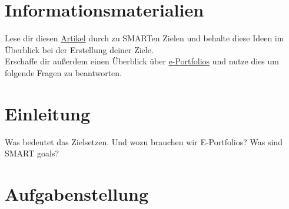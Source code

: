 \documentclass[a4paper,oneside]{scrarticle}
\begin{document}
	\pagebreak 
	
	\section*{Informationsmaterialien}
	Lese dir diesen \href{https://www.atlassian.com/blog/productivity/how-to-write-smart-goals}{Artikel} \cite{boogaard_how_2021} durch zu SMARTen Zielen und behalte diese Ideen im Überblick bei der Erstellung deiner Ziele.\\
	Erschaffe dir außerdem einen Überblick über 	\href{https://sci-hub.ru/https://doi.org/10.1080/00091383.2014.897192}{e-Portfolios} \cite{jenson_defining_2014} und nutze dies um folgende Fragen zu beantworten.
	
	
	
	
	
	
	
	\pagebreak
		
	\section*{Einleitung}
	Was bedeutet das Zielsetzen. Und wozu brauchen wir E-Portfolios? Was sind SMART goals?
	
	\section*{Aufgabenstellung}
\end{document}
